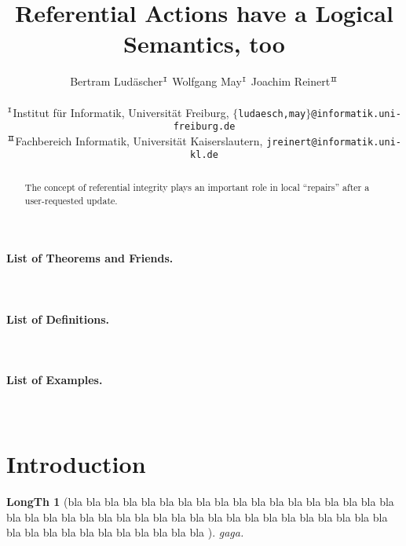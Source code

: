 \documentclass[twoside,11pt]{article}
\theoremstyle{lines}
\theoremstyle{longplain}
\newtheorem{LongTh}{LongTh}
\begin{document}
\title{\bf Referential Actions have a Logical Semantics, too}

\author{\normalsize Bertram Lud\"ascher$^{\texttt{I}}$ \qquad Wolfgang May$^{\texttt{I}}$ 
        \qquad Joachim Reinert$^{\texttt{I$\!$I}}$
        \medskip \\
{\footnotesize\begin{tabular}{c@{}l}
$^{\texttt{I}}$ & Institut f\"ur Informatik, Universit\"at Freiburg,
   {\tt $\{$ludaesch,may$\}$@informatik.uni-freiburg.de} \\
$^{\texttt{I$\!$I}}$ & Fachbereich Informatik, Universit\"at Kaiserslautern,
   {\tt jreinert@informatik.uni-kl.de}
\end{tabular}}} 

\date{}
\thispagestyle{empty}


\begin{abstract} 
  The concept of referential integrity plays an important role in
  local ``repairs'' after a user-requested update.  
\end{abstract}


\paragraph{List of Theorems and Friends.}\
\paragraph{List of Definitions.}\
\theoremlisttype{allname}
\paragraph{List of Examples.}\
\listtheorems{Example}

\section{Introduction}{\label{sec:introduction}}

\begin{LongTh}[bla bla bla bla bla bla bla bla bla bla bla bla bla bla bla bla bla bla bla bla bla bla bla bla bla bla bla bla bla bla bla bla bla bla bla bla bla bla bla bla bla bla bla bla bla bla bla bla bla bla ]
  gaga.
\end{LongTh}
\end{document}

